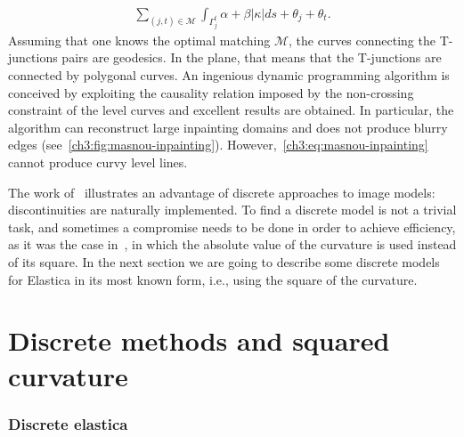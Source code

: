 \begin{align}
	\sum_{(j,t) \in \mathcal{M}}{ \int_{\Gamma_j^t}{\alpha + \beta |\kappa|ds} + \theta_j + \theta_t }.
	\label{ch3:eq:masnou-inpainting}
\end{align}
%
%
Assuming that one knows the optimal matching $\mathcal{M}$, the curves connecting the T-junctions pairs are geodesics. In the plane, that means that the T-junctions are connected by polygonal curves. An ingenious dynamic programming algorithm is conceived  by exploiting the causality relation imposed by the non-crossing constraint of the level curves and excellent results are obtained. In particular, the algorithm can reconstruct large inpainting domains and does not produce blurry edges (see~\cref{ch3:fig:masnou-inpainting}). However,~\cref{ch3:eq:masnou-inpainting} cannot produce curvy level lines.


The work of~\cite{masnou98inpainting} illustrates an advantage of discrete approaches to image models: discontinuities are naturally implemented. To find a discrete model is not a trivial task, and sometimes a compromise needs to be done in order to achieve efficiency, as it was the case in~\cite{masnou98inpainting}, in which the absolute value of the curvature is used instead of its square. In the next section we are going to describe some discrete models for Elastica in its most known form, i.e., using the square of the curvature.


\section{Discrete methods and squared curvature}
\label{ch3:sec:discrete-methods-squared-curvature}

\subsubsection{Discrete elastica}

